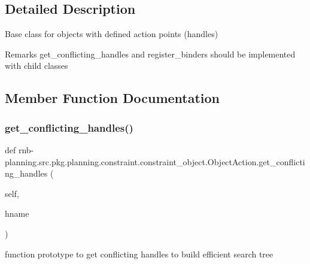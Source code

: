 \subsection{Detailed Description}
Base class for objects with defined action points (handles) 

\begin{DoxyRemark}{Remarks}
get\+\_\+conflicting\+\_\+handles and register\+\_\+binders should be implemented with child classes 
\end{DoxyRemark}


\subsection{Member Function Documentation}
\mbox{\label{classrnb-planning_1_1src_1_1pkg_1_1planning_1_1constraint_1_1constraint__object_1_1_object_action_a04a8f195615a238251d13122ab343ee5}} 
\subsubsection{\texorpdfstring{get\+\_\+conflicting\+\_\+handles()}{get\_conflicting\_handles()}}
{\footnotesize\ttfamily def rnb-\/planning.\+src.\+pkg.\+planning.\+constraint.\+constraint\+\_\+object.\+Object\+Action.\+get\+\_\+conflicting\+\_\+handles (\begin{DoxyParamCaption}\item[{}]{self,  }\item[{}]{hname }\end{DoxyParamCaption})}



function prototype to get conflicting handles to build efficient search tree 


